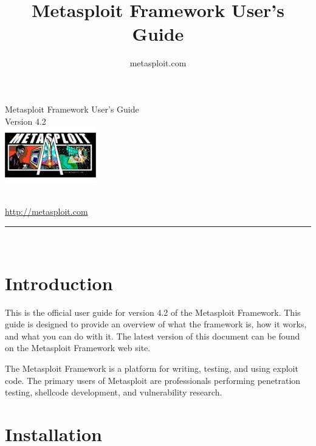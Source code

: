 \documentclass{report}
\begin{document}
\title{Metasploit Framework User's Guide}
\author{metasploit.com}

\begin{titlepage}
    \begin{center}
        \huge{Metasploit Framework User's Guide}
		\ \\[10mm]
		\large{Version 4.2}
		\\[10mm]

        \includegraphics{hacker04.jpg}
		
		\ \\[10mm]
		
        \small{\url{http://metasploit.com}}

        \rule{10cm}{1pt} \\[4mm]
        \renewcommand{\arraystretch}{0.5}
    \end{center}
\end{titlepage}

\tableofcontents

\setlength{\parindent}{0pt} \setlength{\parskip}{8pt}

\chapter{Introduction}

\par
This is the official user guide for version 4.2 of the Metasploit Framework.
This guide is designed to provide an overview of what the framework is, how it
works, and what you can do with it. The latest version of this document can be
found on the Metasploit Framework web site.

\par
The Metasploit Framework is a platform for writing, testing, and using exploit
code. The primary users of Metasploit are professionals performing penetration
testing, shellcode development, and vulnerability research.

\par
\pagebreak

\chapter{Installation}
\end{document}
